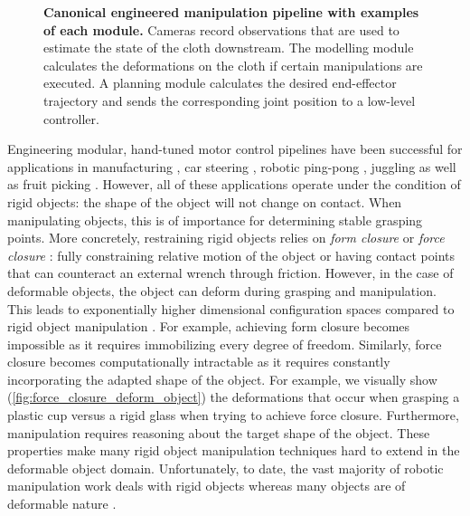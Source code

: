 \begin{figure}[p]
    \centering
    
    \vspace*{-10mm}
    \caption[Canonical engineered manipulation pipeline.]{\textbf{Canonical engineered manipulation pipeline with examples of each module.} Cameras record observations that are used to estimate the state of the cloth downstream. The modelling module calculates the deformations on the cloth if certain manipulations are executed. A planning module calculates the desired end-effector trajectory and sends the corresponding joint position to a low-level controller.
    }
    \label{fig:canonical_robotic_manipulation_engineered_pipeline}
\end{figure}

Engineering modular, hand-tuned motor control pipelines have been successful for applications in manufacturing \autocite{Clocksin1985,Mochizuki1987}, car steering \autocite{Dickmanns1988}, robotic ping-pong \autocite{Andersson1987}, juggling \autocite{Rizzi1993} as well as fruit picking \autocite{Harrell1989}. However, all of these applications operate under the condition of rigid objects: the shape of the object will not change on contact.
When manipulating objects, this is of importance for determining stable grasping points. More concretely, restraining rigid objects relies on \textit{form closure} \autocite{Nguyen1988} or \textit{force closure} \autocite{Bicchi1995}: fully constraining relative motion of the object or having contact points that can counteract an external wrench through friction.
However, in the case of deformable objects, the object can deform during grasping and manipulation. This leads to exponentially higher dimensional configuration spaces compared to rigid object manipulation \autocite{Foresti2004}. For example, achieving form closure becomes impossible as it requires immobilizing every degree of freedom. Similarly, force closure becomes computationally intractable as it requires constantly incorporating the adapted shape of the object. For example, we visually show (\cref{fig:force_closure_deform_object}) the deformations that occur when grasping a plastic cup versus a rigid glass when trying to achieve force closure. Furthermore, manipulation requires reasoning about the target shape of the object. These properties make many rigid object manipulation techniques hard to extend in the deformable object domain. Unfortunately, to date, the vast majority of robotic manipulation work deals with rigid objects whereas many objects are of deformable nature \autocite{Siciliano2008}.

